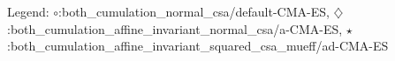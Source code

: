 Legend: {\color{CornflowerBlue}$\circ$}:both\_cumulation\_normal\_csa/default-CMA-ES, {\color{Orange}$\diamondsuit$}:both\_cumulation\_affine\_invariant\_normal\_csa/a-CMA-ES, {\color{Green}$\star$}:both\_cumulation\_affine\_invariant\_squared\_csa\_mueff/ad-CMA-ES
